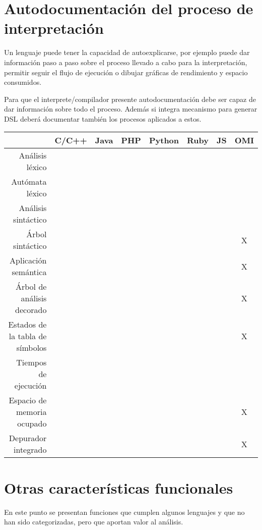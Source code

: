 \section{Autodocumentación del proceso de interpretación} 
Un lenguaje puede tener la capacidad de autoexplicarse, por ejemplo puede dar información 
paso a paso sobre el proceso llevado a cabo para la interpretación, permitir 
seguir el flujo de ejecución o dibujar gráficas de rendimiento y espacio consumidos.

Para que el interprete/compilador presente autodocumentación debe ser capaz de dar información sobre todo 
el proceso. Además si integra mecanismo para generar DSL deberá documentar también los procesos
aplicados a estos. 

\FloatBarrier
\begin{table}[h]
\begin{center}
 
\begin{tabular}{|r|c|c|c|c|c|c|c|} \hline
 & C/C++ & Java & PHP  & Python & Ruby & JS & OMI\\ \hline
Análisis léxico & &  &  &  &   &   &  \\ \hline
Autómata léxico & & &  &  &   &   &  \\ \hline
Análisis sintáctico & & &  &  &   &   &  \\ \hline
Árbol sintáctico & & &  &  &   &   & X \\ \hline
Aplicación semántica & & &  &  &   &   & X \\ \hline
Árbol de análisis decorado & & &  &  &   &   & X \\ \hline
Estados de la tabla de símbolos & & &  &  &   &   & X \\ \hline
Tiempos de ejecución & & &  &  &   &   &  \\ \hline
Espacio de memoria ocupado & & &  &  &   &   & X \\ \hline
Depurador integrado & & &  &  &   &   & X \\ \hline
\end{tabular}
\end{center}
\end{table}
\FloatBarrier



\section{Otras características funcionales}
En este punto se presentan funciones que cumplen algunos lenguajes
y que no han sido categorizadas, pero que aportan 
valor al análisis.

